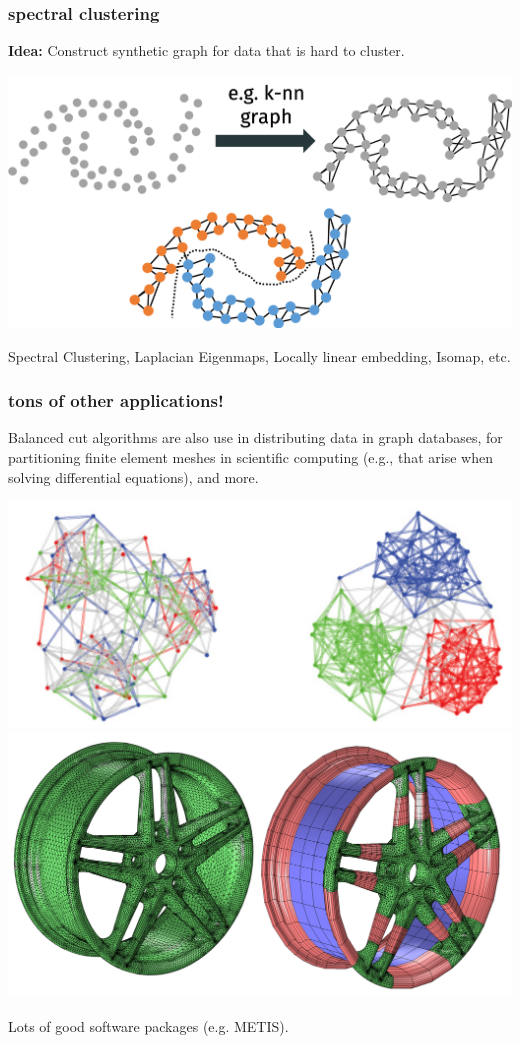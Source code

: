 \documentclass[compress]{beamer}
\begin{document}
\begin{frame}
	\frametitle{spectral clustering}
	\textbf{Idea:} Construct synthetic graph for data that is hard to cluster.
	
	\begin{center}
		\includegraphics[width=\textwidth]{cut_clustering.png}
		
		Spectral Clustering, Laplacian Eigenmaps, Locally linear embedding, Isomap, etc.
	\end{center}
	
\end{frame}

\begin{frame}
	\frametitle{tons of other applications!}
	Balanced cut algorithms are also use in distributing data in graph databases, for partitioning finite element meshes in scientific computing (e.g., that arise when solving differential equations), and more. 
	
	\begin{center}
	\includegraphics[height=.3\textheight]{balanced_partition.png} \hfill	\includegraphics[height=.3\textheight]{finite_element_1.png}
	
	Lots of good software packages (e.g. METIS). 
	\end{center}
\end{frame}
\end{document}
